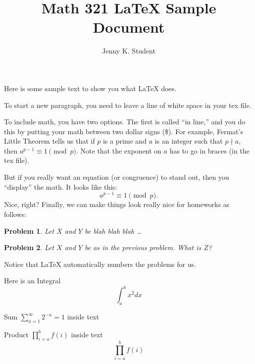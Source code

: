 \documentclass[11pt]{amsart}
\title{Math 321 LaTeX Sample Document}
\author{Jenny K. Student}
\date{}
\newtheorem{problem}{Problem}
\begin{document}
\maketitle

Here is some sample text to show you what LaTeX does. 

To start a new paragraph, you need to leave a line of white space in your tex file.

To include math, you have two options. The first is called ``in line,'' and you do this by putting your math between two dollar signs (\$). For example, Fermat's Little Theorem tells us that if $p$ is a prime and $a$ is an integer such that $p \nmid a$, then $a^{p-1} \equiv 1 \pmod{p}$. Note that the exponent on $a$ has to go in braces (in the tex file). 

But if you really want an equation (or congruence) to stand out, then you ``display'' the math. It looks like this:
\[
	a^{p-1} \equiv 1 \pmod{p}.
\]
Nice, right?
Finally, we can make things look really nice for homeworks as follows:

\begin{problem}
	Let $X$ and $Y$ be blah blah blah \ldots
\end{problem}

\begin{problem}
	Let $X$ and $Y$ be as in the previous problem. What is $Z$?
\end{problem}

Notice that LaTeX automatically numbers the problems for us. 

Here is an Integral
$$\int_{a}^{b} x^2 dx$$

Sum $\sum_{n=1}^{\infty} 2^{-n} = 1$ inside text

Product $\prod_{i=a}^{b} f(i)$ inside text
$$\prod_{i=a}^{b} f(i)$$


\end{document}
